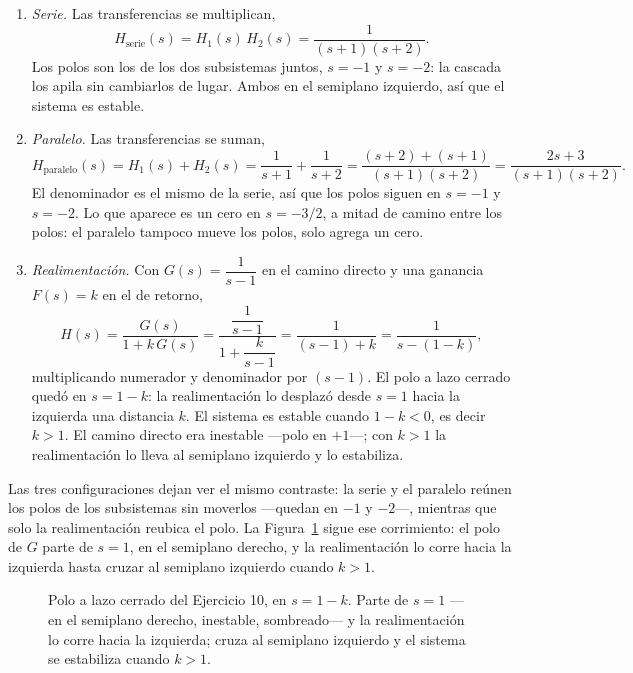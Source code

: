 \documentclass[10pt,a4paper]{article}
\begin{document}
\begin{enumerate}
	\item \emph{Serie.} Las transferencias se multiplican,
	\[
		H_{\text{serie}}(s)=H_1(s)\,H_2(s)=\frac{1}{(s+1)(s+2)}.
	\]
	Los polos son los de los dos subsistemas juntos, $s=-1$ y $s=-2$: la
	cascada los apila sin cambiarlos de lugar. Ambos en el semiplano izquierdo,
	así que el sistema es estable.

	\item \emph{Paralelo.} Las transferencias se suman,
	\[
		H_{\text{paralelo}}(s)=H_1(s)+H_2(s)
		    =\frac{1}{s+1}+\frac{1}{s+2}
		    =\frac{(s+2)+(s+1)}{(s+1)(s+2)}=\frac{2s+3}{(s+1)(s+2)}.
	\]
	El denominador es el mismo de la serie, así que los polos siguen en $s=-1$
	y $s=-2$. Lo que aparece es un cero en $s=-3/2$, a mitad de camino entre los
	polos: el paralelo tampoco mueve los polos, solo agrega un cero.

	\item \emph{Realimentación.} Con $G(s)=\dfrac{1}{s-1}$ en el camino directo y
	una ganancia $F(s)=k$ en el de retorno,
	\[
		H(s)=\frac{G(s)}{1+k\,G(s)}
		    =\frac{\dfrac{1}{s-1}}{1+\dfrac{k}{s-1}}
		    =\frac{1}{(s-1)+k}=\frac{1}{s-(1-k)},
	\]
	multiplicando numerador y denominador por $(s-1)$. El polo a lazo cerrado
	quedó en $s=1-k$: la realimentación lo desplazó desde $s=1$ hacia la
	izquierda una distancia $k$. El sistema es estable cuando $1-k<0$, es decir
	$k>1$. El camino directo era inestable ---polo en $+1$---; con $k>1$ la
	realimentación lo lleva al semiplano izquierdo y lo estabiliza.
\end{enumerate}

Las tres configuraciones dejan ver el mismo contraste: la serie y el paralelo
reúnen los polos de los subsistemas sin moverlos ---quedan en $-1$ y $-2$---,
mientras que solo la realimentación reubica el polo. La
Figura~\ref{fig:res_realim} sigue ese corrimiento: el polo de $G$ parte de
$s=1$, en el semiplano derecho, y la realimentación lo corre hacia la izquierda
hasta cruzar al semiplano izquierdo cuando $k>1$.

\begin{figure}[h]
	\centering
	
	\caption{Polo a lazo cerrado del Ejercicio 10, en $s=1-k$. Parte de $s=1$
	---en el semiplano derecho, inestable, sombreado--- y la realimentación lo
	corre hacia la izquierda; cruza al semiplano izquierdo y el sistema se
	estabiliza cuando $k>1$.}
	\label{fig:res_realim}
\end{figure}
\end{document}
